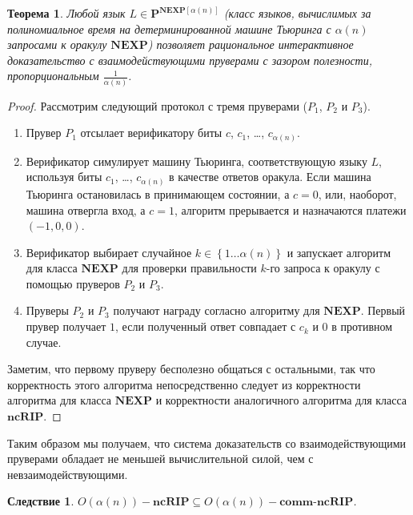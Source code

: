 \documentclass[14pt, a4paper]{extreport}
\newtheorem{theorem}{\indent Теорема}
\newtheorem{corollary}{\indent Следствие}
\newcommand{\set}[1]{\left\{#1\right\}}
\begin{document}
        \begin{theorem}Любой язык $L \in \textbf{P}^{\textbf{NEXP}\left[\alpha(n)\right]}$ (класс языков, вычислимых за полиномиальное время на детерминированной машине Тьюринга с $\alpha(n)$ запросами к оракулу $\textbf{NEXP}$) позволяет рациональное интерактивное доказательство с взаимодействующими пруверами с зазором полезности, пропорциональным $\frac{1}{\alpha(n)}$.\end{theorem}

            \begin{proof}
                Рассмотрим следующий протокол с тремя пруверами ($P_1$, $P_2$ и $P_3$).
                \begin{enumerate}
                    \item Прувер $P_1$ отсылает верификатору биты $c$, $c_1$, \ldots, $c_{\alpha(n)}$.
                    \item Верификатор симулирует машину Тьюринга, соответствующую языку $L$, используя биты $c_1$, \ldots, $c_{\alpha(n)}$ в качестве ответов оракула. Если машина Тьюринга остановилась в принимающем состоянии, а $c = 0$, или, наоборот, машина отвергла вход, а $c = 1$, алгоритм прерывается и назначаются платежи $(-1, 0, 0)$.
                    \item Верификатор выбирает случайное $k \in \set{1\ldots\alpha(n)}$ и запускает алгоритм для класса $\textbf{NEXP}$ для проверки правильности $k$-го запроса к оракулу с помощью пруверов $P_2$ и $P_3$.
                    \item Пруверы $P_2$ и $P_3$ получают награду согласно алгоритму для $\textbf{NEXP}$. Первый прувер получает $1$, если полученный ответ совпадает с $c_k$ и $0$ в противном случае.
                \end{enumerate}
                Заметим, что первому пруверу бесполезно общаться с остальными, так что корректность этого алгоритма непосредственно следует из корректности алгоритма для класса $\textbf{NEXP}$ и корректности аналогичного алгоритма для класса $\textbf{ncRIP}$.
            \end{proof}
            Таким образом мы получаем, что система доказательств со взаимодействующими пруверами обладает не меньшей вычислительной силой, чем с невзаимодействующими.
            \begin{corollary}
                $O\left(\alpha(n)\right)-\textbf{ncRIP} \subseteq O\left(\alpha(n)\right)-\textbf{comm-ncRIP}$.
            \end{corollary}
\end{document}

